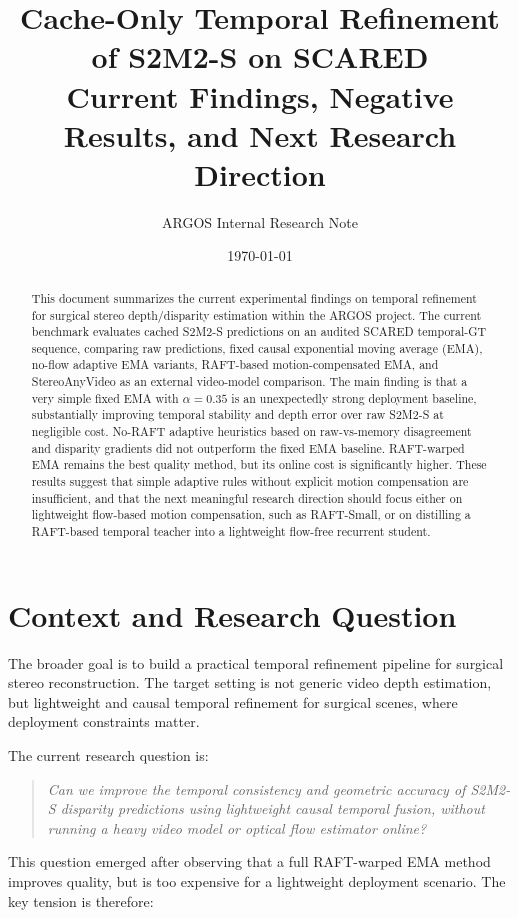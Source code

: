 \documentclass[11pt,a4paper]{article}
\title{
    \textbf{Cache-Only Temporal Refinement of S2M2-S on SCARED}\\
    \large Current Findings, Negative Results, and Next Research Direction
}
\author{ARGOS Internal Research Note}
\date{\today}
\begin{document}
\maketitle

\begin{abstract}
This document summarizes the current experimental findings on temporal refinement for surgical stereo depth/disparity estimation within the ARGOS project. The current benchmark evaluates cached S2M2-S predictions on an audited SCARED temporal-GT sequence, comparing raw predictions, fixed causal exponential moving average (EMA), no-flow adaptive EMA variants, RAFT-based motion-compensated EMA, and StereoAnyVideo as an external video-model comparison. The main finding is that a very simple fixed EMA with $\alpha=0.35$ is an unexpectedly strong deployment baseline, substantially improving temporal stability and depth error over raw S2M2-S at negligible cost. No-RAFT adaptive heuristics based on raw-vs-memory disagreement and disparity gradients did not outperform the fixed EMA baseline. RAFT-warped EMA remains the best quality method, but its online cost is significantly higher. These results suggest that simple adaptive rules without explicit motion compensation are insufficient, and that the next meaningful research direction should focus either on lightweight flow-based motion compensation, such as RAFT-Small, or on distilling a RAFT-based temporal teacher into a lightweight flow-free recurrent student.
\end{abstract}

\section{Context and Research Question}

The broader goal is to build a practical temporal refinement pipeline for surgical stereo reconstruction. The target setting is not generic video depth estimation, but lightweight and causal temporal refinement for surgical scenes, where deployment constraints matter.

The current research question is:

\begin{quote}
\emph{Can we improve the temporal consistency and geometric accuracy of S2M2-S disparity predictions using lightweight causal temporal fusion, without running a heavy video model or optical flow estimator online?}
\end{quote}

This question emerged after observing that a full RAFT-warped EMA method improves quality, but is too expensive for a lightweight deployment scenario. The key tension is therefore:
\end{document}
